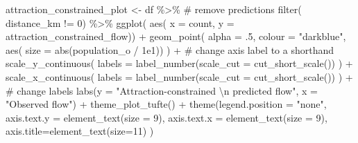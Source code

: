 \documentclass[
  a4paper, 
  twoside,
  final
]{article}
\newenvironment{Shaded}{\begin{snugshade}}{\end{snugshade}}
\newcommand{\AttributeTok}[1]{\textcolor[rgb]{0.40,0.45,0.13}{#1}}
\newcommand{\CommentTok}[1]{\textcolor[rgb]{0.37,0.37,0.37}{#1}}
\newcommand{\DecValTok}[1]{\textcolor[rgb]{0.68,0.00,0.00}{#1}}
\newcommand{\FloatTok}[1]{\textcolor[rgb]{0.68,0.00,0.00}{#1}}
\newcommand{\FunctionTok}[1]{\textcolor[rgb]{0.28,0.35,0.67}{#1}}
\newcommand{\NormalTok}[1]{\textcolor[rgb]{0.00,0.23,0.31}{#1}}
\newcommand{\OtherTok}[1]{\textcolor[rgb]{0.00,0.23,0.31}{#1}}
\newcommand{\SpecialCharTok}[1]{\textcolor[rgb]{0.37,0.37,0.37}{#1}}
\newcommand{\StringTok}[1]{\textcolor[rgb]{0.13,0.47,0.30}{#1}}
\begin{document}
\begin{Shaded}
\begin{Highlighting}[]
\NormalTok{attraction\_constrained\_plot }\OtherTok{\textless{}{-}}\NormalTok{ df }\SpecialCharTok{\%\textgreater{}\%} 
  \CommentTok{\# remove predictions}
  \FunctionTok{filter}\NormalTok{( distance\_km }\SpecialCharTok{!=} \DecValTok{0}\NormalTok{) }\SpecialCharTok{\%\textgreater{}\%} 
  \FunctionTok{ggplot}\NormalTok{( }\FunctionTok{aes}\NormalTok{( }\AttributeTok{x =}\NormalTok{ count, }\AttributeTok{y =}\NormalTok{ attraction\_constrained\_flow)) }\SpecialCharTok{+}
  \FunctionTok{geom\_point}\NormalTok{( }\AttributeTok{alpha =}\NormalTok{ .}\DecValTok{5}\NormalTok{, }\AttributeTok{colour =} \StringTok{"darkblue"}\NormalTok{,}
              \FunctionTok{aes}\NormalTok{( }\AttributeTok{size =} \FunctionTok{abs}\NormalTok{(population\_o }\SpecialCharTok{/} \FloatTok{1e1}\NormalTok{)) ) }\SpecialCharTok{+}
  \CommentTok{\# change axis label to a shorthand}
  \FunctionTok{scale\_y\_continuous}\NormalTok{(}
    \AttributeTok{labels =} \FunctionTok{label\_number}\NormalTok{(}\AttributeTok{scale\_cut =} \FunctionTok{cut\_short\_scale}\NormalTok{())}
\NormalTok{    ) }\SpecialCharTok{+} 
  \FunctionTok{scale\_x\_continuous}\NormalTok{(}
    \AttributeTok{labels =} \FunctionTok{label\_number}\NormalTok{(}\AttributeTok{scale\_cut =} \FunctionTok{cut\_short\_scale}\NormalTok{())}
\NormalTok{    ) }\SpecialCharTok{+} 
  \CommentTok{\# change labels}
  \FunctionTok{labs}\NormalTok{(}\AttributeTok{y =} \StringTok{"Attraction{-}constrained }\SpecialCharTok{\textbackslash{}n}\StringTok{ predicted flow"}\NormalTok{,}
       \AttributeTok{x =} \StringTok{"Observed flow"}\NormalTok{) }\SpecialCharTok{+}
  \FunctionTok{theme\_plot\_tufte}\NormalTok{() }\SpecialCharTok{+}
  \FunctionTok{theme}\NormalTok{(}\AttributeTok{legend.position =} \StringTok{"none"}\NormalTok{,}
        \AttributeTok{axis.text.y =} \FunctionTok{element\_text}\NormalTok{(}\AttributeTok{size =} \DecValTok{9}\NormalTok{),}
        \AttributeTok{axis.text.x =} \FunctionTok{element\_text}\NormalTok{(}\AttributeTok{size =} \DecValTok{9}\NormalTok{),}
        \AttributeTok{axis.title=}\FunctionTok{element\_text}\NormalTok{(}\AttributeTok{size=}\DecValTok{11}\NormalTok{)}
\NormalTok{        )}


\end{Highlighting}
\end{Shaded}
\end{document}
